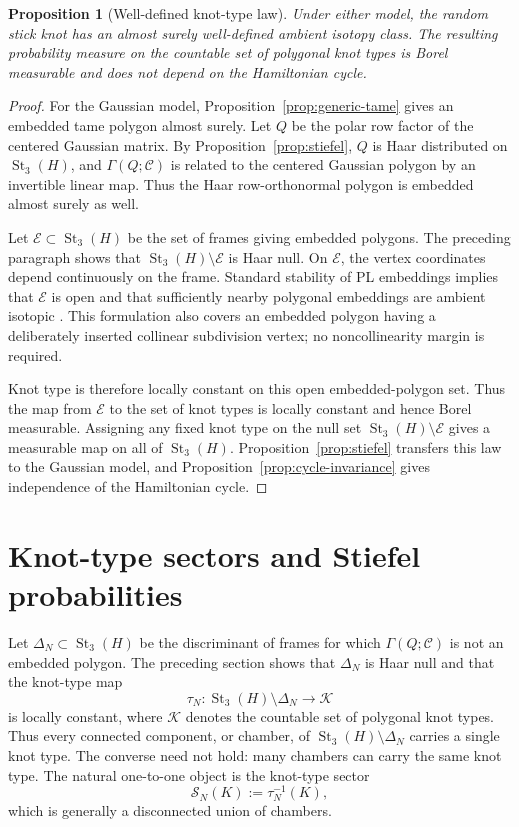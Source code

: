 \documentclass[11pt]{amsart}
\newtheorem{proposition}{Proposition}
\theoremstyle{remark}
\newcommand{\1}{\mathbf{1}}
\newcommand{\Kcal}{\mathcal{K}}
\newcommand{\St}{\operatorname{St}}
\begin{document}
\begin{proposition}[Well-defined knot-type law]\label{prop:knot-type-law}
Under either model, the random stick knot has an almost surely well-defined ambient isotopy
class.  The resulting probability measure on the countable set of polygonal knot types is
Borel measurable and does not depend on the Hamiltonian cycle.
\end{proposition}

\begin{proof}
For the Gaussian model, Proposition~\ref{prop:generic-tame} gives an embedded tame polygon
almost surely.  Let \(Q\) be the polar row factor of the centered Gaussian matrix.  By
Proposition~\ref{prop:stiefel}, \(Q\) is Haar distributed on \(\St_3(H)\), and
\(\Gamma(Q;\mathcal C)\) is related to the centered Gaussian polygon by an invertible linear
map.  Thus the Haar row-orthonormal polygon is embedded almost surely as well.

Let \(\mathcal E\subset\St_3(H)\) be the set of frames giving embedded polygons.  The
preceding paragraph shows that \(\St_3(H)\setminus\mathcal E\) is Haar null.  On
\(\mathcal E\), the vertex coordinates depend continuously on the frame.  Standard
stability of PL embeddings implies that \(\mathcal E\) is open and that sufficiently
nearby polygonal embeddings are ambient isotopic \cite{EdwardsKirby}.  This formulation
also covers an embedded polygon having a deliberately inserted collinear subdivision
vertex; no noncollinearity margin is required.

Knot type is therefore locally constant on this open embedded-polygon set.  Thus the map
from \(\mathcal E\) to the set of knot
types is locally constant and hence Borel measurable.  Assigning any fixed knot type on the
null set \(\St_3(H)\setminus\mathcal E\) gives a measurable map on all of \(\St_3(H)\).
Proposition~\ref{prop:stiefel} transfers this law to the Gaussian model, and
Proposition~\ref{prop:cycle-invariance} gives independence of the Hamiltonian cycle.
\end{proof}

\section{Knot-type sectors and Stiefel probabilities}

Let \(\Delta_N\subset\St_3(H)\) be the discriminant of frames for which
\(\Gamma(Q;\mathcal C)\) is not an embedded polygon.  The preceding section shows that
\(\Delta_N\) is Haar null and that the knot-type map
\[
    \tau_N:\St_3(H)\setminus\Delta_N\longrightarrow \Kcal
\]
is locally constant, where \(\Kcal\) denotes the countable set of polygonal knot types.
Thus every connected component, or chamber, of
\(\St_3(H)\setminus\Delta_N\) carries a single knot type.  The converse need not hold:
many chambers can carry the same knot type.  The natural one-to-one object is the
knot-type sector
\[
    \mathcal S_N(K):=\tau_N^{-1}(K),
\]
which is generally a disconnected union of chambers.
\end{document}

